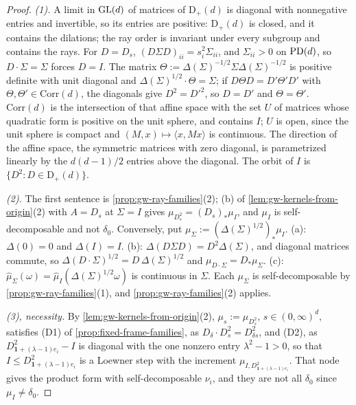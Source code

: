 \begin{proof}
\leanok
\emph{(1).} A limit in $\mathrm{GL}(d)$ of matrices of $\mathrm D_+(d)$ is diagonal with nonnegative entries and
invertible, so its entries are positive: $\mathrm D_+(d)$ is closed, and it contains the dilations; the ray
order is invariant under every subgroup and contains the rays. For $D = D_s$, $(D\Sigma D)_{ii} =
s_i^2\Sigma_{ii}$, and $\Sigma_{ii} > 0$ on $\mathrm{PD}(d)$, so $D\cdot\Sigma = \Sigma$ forces $D = I$. The matrix
$\Theta := \Delta(\Sigma)^{-1/2}\Sigma\Delta(\Sigma)^{-1/2}$ is positive definite with unit diagonal and
$\Delta(\Sigma)^{1/2}\cdot \Theta = \Sigma$; if $D\Theta D = D'\Theta'D'$ with $\Theta, \Theta' \in \mathrm{Corr}(d)$, the diagonals
give $D^2 = D'^2$, so $D = D'$ and $\Theta = \Theta'$. $\mathrm{Corr}(d)$ is the intersection of that affine space
with the set $U$ of matrices whose quadratic form is positive on the unit sphere, and contains $I$; $U$ is
open, since the unit sphere is compact and $(M, x) \mapsto \langle x, Mx\rangle$ is continuous. The
direction of the affine space, the symmetric matrices with zero diagonal, is parametrized linearly by the
$d(d-1)/2$ entries above the diagonal. The orbit of $I$ is $\{D^2 : D \in \mathrm D_+(d)\}$.

\emph{(2).} The first sentence is \ref{prop:gw-ray-families}(2); (b) of
\ref{lem:gw-kernels-from-origin}(2) with $A = D_s$ at $\Sigma = I$ gives $\mu_{D_s^2} = (D_s)_*\mu_I$, and
$\mu_I$ is self-decomposable and not $\delta_0$. Conversely, put $\mu_\Sigma :=
(\Delta(\Sigma)^{1/2})_*\mu_I$. (a): $\Delta(0) = 0$ and $\Delta(I) = I$. (b): $\Delta(D\Sigma D) =
D^2\Delta(\Sigma)$, and diagonal matrices commute, so $\Delta(D\cdot\Sigma)^{1/2} = D\,\Delta(\Sigma)^{1/2}$ and
$\mu_{D\cdot\Sigma} = D_*\mu_\Sigma$. (c): $\widehat\mu_\Sigma(\omega) = \widehat\mu_I(\Delta(\Sigma)^{1/2}\omega)$
is continuous in $\Sigma$. Each $\mu_\Sigma$ is self-decomposable by \ref{prop:gw-ray-families}(1), and
\ref{prop:gw-ray-families}(2) applies.

\emph{(3), necessity.} By \ref{lem:gw-kernels-from-origin}(2), $\mu_s := \mu_{D_s^2}$,
$s \in (0,\infty)^d$, satisfies (D1) of \ref{prop:fixed-frame-families}, as
$D_\delta\cdot D_s^2 = D_{\delta s}^2$, and (D2), as $D^2_{\mathbf 1 + (\lambda-1)e_i} - I$ is diagonal with
the one nonzero entry $\lambda^2 - 1 > 0$, so that $I \le D^2_{\mathbf 1 + (\lambda-1)e_i}$ is a Loewner
step with the increment $\mu_{I, D^2_{\mathbf 1 + (\lambda-1)e_i}}$. That node gives the product form with
self-decomposable $\nu_i$, and they are not all $\delta_0$ since $\mu_I \ne \delta_0$.


\end{proof}
